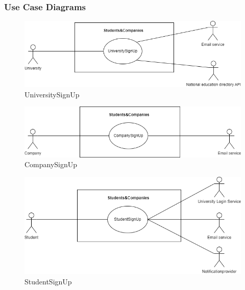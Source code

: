 \documentclass[a4paper,12pt]{article}
\begin{document}
\subsubsection{Use Case Diagrams}
\begin{figure}[H]
    \centering
    \includegraphics[scale = 0.45]{figures/UseCasesDiagrams/UniversityLogin.drawio.png}
    \caption{UniversitySignUp}
    \centering
\end{figure}
\begin{figure}[H]
    \centering
    \includegraphics[scale = 0.45]{figures/UseCasesDiagrams/CompanySignUp.drawio.png}
    \caption{CompanySignUp}
    \centering
\end{figure}
\begin{figure}[H]
    \centering
    \includegraphics[scale = 0.45]{figures/UseCasesDiagrams/StudentSignUp.drawio.png}
    \caption{StudentSignUp}
    \centering
\end{figure}
\end{document}
